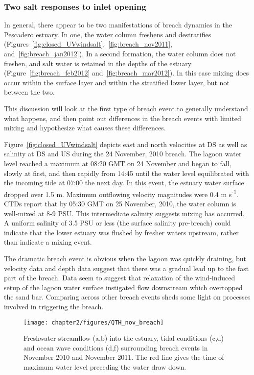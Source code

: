 \subsubsection{Two salt responses to inlet opening}
In general, there appear to be two manifestations of breach dynamics in the Pescadero estuary.  In one, the water column freshens and destratifies (Figures~\ref{fig:closed_UVwindsalt},~\ref{fig:breach_nov2011}, and~\ref{fig:breach_jan2012}). In a second formation, the water column does not freshen, and salt water is retained in the depths of the estuary (Figure~\ref{fig:breach_feb2012} and~\ref{fig:breach_mar2012}). In this case mixing does occur within the surface layer and within the stratified lower layer, but not between the two.

This discussion will look at the first type of breach event to generally understand what happens, and then point out differences in the breach events with limited mixing and hypothesize what causes these differences. 

Figure~\ref{fig:closed_UVwindsalt} depicts east and north velocities at DS as well as salinity at DS and US during the 24 November, 2010 breach. The lagoon water level reached a maximum at 08:20 GMT on 24 November and began to fall, slowly at first, and then rapidly from 14:45 until the water level equilibrated with the incoming tide at 07:00 the next day. In this event, the estuary water surface dropped over 1.5 m. Maximum outflowing velocity magnitudes were 0.4 m s\textsuperscript{-1}. CTDs report that by 05:30 GMT on 25 November, 2010, the water column is well-mixed at 8-9 PSU. This intermediate salinity suggests mixing has occurred. A uniform salinity of 3.5 PSU or less (the surface salinity pre-breach) could indicate that the lower estuary was flushed by fresher waters upstream, rather than indicate a mixing event.

The dramatic breach event is obvious when the lagoon was quickly draining, but velocity data and depth data suggest that there was a gradual lead up to the fast part of the breach. Data seem to suggest that relaxation of the wind-induced setup of the lagoon water surface instigated flow downstream which overtopped the sand bar. Comparing across other breach events sheds some light on processes involved in triggering the breach. 



\begin{figure}[h]
	\texttt{[image: chapter2/figures/QTH\_nov\_breach]}
\caption{Freshwater streamflow (a,b) into the estuary, tidal conditions (c,d) and ocean wave conditions (d,f) surrounding breach events in November 2010 and November 2011. The red line gives the time of maximum water level preceding the water draw down.} \label{fig:QbreachNov}
\end{figure}


